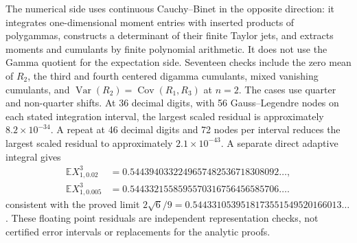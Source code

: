 The numerical side uses continuous Cauchy--Binet in the opposite
direction: it integrates one-dimensional moment entries with inserted
products of polygammas, constructs a determinant of their finite Taylor
jets, and extracts moments and cumulants by finite polynomial
arithmetic. It does not use the Gamma quotient for the expectation
side. Seventeen checks include the zero mean of $R_2$, the third and
fourth centered digamma cumulants, mixed vanishing cumulants, and
$\operatorname{Var}(R_2)=\operatorname{Cov}(R_1,R_3)$ at $n=2$.
The cases use quarter and non-quarter shifts. At 36 decimal digits,
with 56 Gauss--Legendre nodes on each stated integration interval, the
largest scaled residual is approximately $8.2\times10^{-34}$.
A repeat at 46 decimal digits and 72 nodes per interval
reduces the largest scaled residual to approximately $2.1\times10^{-43}$.
A separate direct adaptive integral gives
\[
 \begin{aligned}
 \mathbb EX_{1,0.02}^3
 &=0.5443940332249657482536718308092\ldots,\\
 \mathbb EX_{1,0.005}^3
 &=0.5443321558595570316756456585706\ldots.
 \end{aligned}
\]
consistent with the proved limit
$2\sqrt6/9=0.5443310539518173551549520166013\ldots$.
These floating point residuals are independent representation checks,
not certified error intervals or replacements for the analytic proofs.
